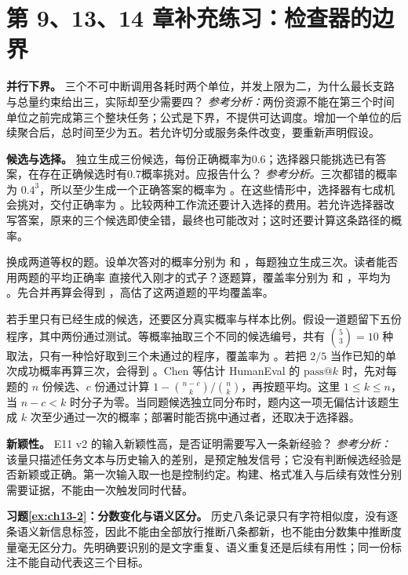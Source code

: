 \section{第 9、13、14 章补充练习：检查器的边界}
\label{sec:appg-checkers}

\textbf{并行下界。} 三个不可中断调用各耗时两个单位，并发上限为二，为什么最长支路与总量约束给出三，实际却至少需要四？
\emph{参考分析：}两份资源不能在第三个时间单位之前完成第三个整块任务；公式是下界，不提供可达调度。增加一个单位的后续聚合后，总时间至少为五。若允许切分或服务条件改变，要重新声明假设。

\textbf{候选与选择。} 独立生成三份候选，每份正确概率为0.6；选择器只能挑选已有答案，在存在正确候选时有0.7概率挑对。应报告什么？
\emph{参考分析。}三次都错的概率为 $0.4^3$，所以至少生成一个正确答案的概率为 。在这些情形中，选择器有七成机会挑对，交付正确率为 。比较两种工作流还要计入选择的费用。若允许选择器改写答案，原来的三个候选即使全错，最终也可能改对；这时还要计算这条路径的概率。

换成两道等权的题。设单次答对的概率分别为  和 ，每题独立生成三次。读者能否用两题的平均正确率  直接代入刚才的式子？逐题算，覆盖率分别为  和 ，平均为 。先合并再算会得到 ，高估了这两道题的平均覆盖率。

若手里只有已经生成的候选，还要区分真实概率与样本比例。假设一道题留下五份程序，其中两份通过测试。等概率抽取三个不同的候选编号，共有 $\binom{5}{3}=10$ 种取法，只有一种恰好取到三个未通过的程序，覆盖率为 。若把 $2/5$ 当作已知的单次成功概率再算三次，会得到 。Chen 等估计 HumanEval 的 $\mathrm{pass}@k$ 时，先对每题的 $n$ 份候选、$c$ 份通过计算 $1-\binom{n-c}{k}/\binom{n}{k}$，再按题平均。这里 $1\le k\le n$，当 $n-c<k$ 时分子为零。当同题候选独立同分布时，题内这一项无偏估计该题生成 $k$ 次至少通过一次的概率；部署时能否挑中通过者，还取决于选择器\cite{chen-humaneval-2107}。

\textbf{新颖性。} E11 v2 的输入新颖性高，是否证明需要写入一条新经验？
\emph{参考分析：}该量只描述任务文本与历史输入的差别，是预定触发信号；它没有判断候选经验是否新颖或正确。第一次输入取一也是控制约定。构建、格式准入与后续有效性分别需要证据，不能由一次触发同时代替。


\textbf{习题\ref{ex:ch13-2}：分数变化与语义区分。}
历史八条记录只有字符相似度，没有逐条语义新信息标签，因此不能由全部放行推断八条都新，也不能由分数集中推断度量毫无区分力。先明确要识别的是文字重复、语义重复还是后续有用性；同一份标注不能自动代表这三个目标。

